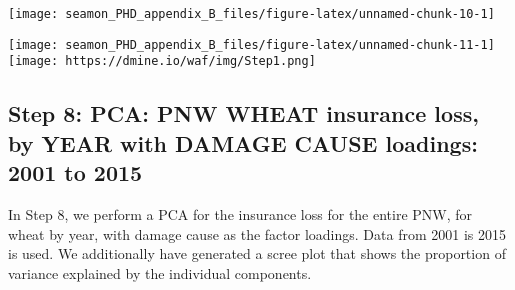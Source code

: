 \documentclass[]{article}
\newenvironment{Shaded}{\begin{snugshade}}{\end{snugshade}}
\newcommand{\CommentTok}[1]{\textcolor[rgb]{0.56,0.35,0.01}{\textit{#1}}}
\newcommand{\DataTypeTok}[1]{\textcolor[rgb]{0.13,0.29,0.53}{#1}}
\newcommand{\DecValTok}[1]{\textcolor[rgb]{0.00,0.00,0.81}{#1}}
\newcommand{\KeywordTok}[1]{\textcolor[rgb]{0.13,0.29,0.53}{\textbf{#1}}}
\newcommand{\NormalTok}[1]{#1}
\newcommand{\OperatorTok}[1]{\textcolor[rgb]{0.81,0.36,0.00}{\textbf{#1}}}
\newcommand{\StringTok}[1]{\textcolor[rgb]{0.31,0.60,0.02}{#1}}
\begin{document}
\texttt{[image: seamon\_PHD\_appendix\_B\_files/figure-latex/unnamed-chunk-10-1]}

\begin{Shaded}
\end{Shaded}

\texttt{[image: seamon\_PHD\_appendix\_B\_files/figure-latex/unnamed-chunk-11-1]}
\texttt{[image: https://dmine.io/waf/img/Step1.png]}

\hypertarget{step-8-pca-pnw-wheat-insurance-loss-by-year-with-damage-cause-loadings-2001-to-2015}{%
\subsection{Step 8: PCA: PNW WHEAT insurance loss, by YEAR with DAMAGE
CAUSE loadings: 2001 to
2015}\label{step-8-pca-pnw-wheat-insurance-loss-by-year-with-damage-cause-loadings-2001-to-2015}}

In Step 8, we perform a PCA for the insurance loss for the entire PNW,
for wheat by year, with damage cause as the factor loadings. Data from
2001 is 2015 is used. We additionally have generated a scree plot that
shows the proportion of variance explained by the individual components.
\end{document}
